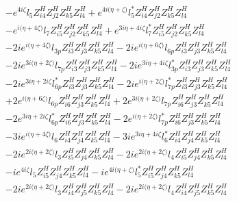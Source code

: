 \begin{align}
 &- e^{4 i \zeta } l_5 Z_{{i 4}}^{H} Z_{{j 2}}^{H} Z_{{k 5}}^{H} Z_{{l 4}}^{H} +e^{4 i \Big(\eta +\zeta \Big)} l_5^* Z_{{i 4}}^{H} Z_{{j 2}}^{H} Z_{{k 5}}^{H} Z_{{l 4}}^{H} \nonumber \\ 
 &- e^{i \Big(\eta +4 \zeta \Big)} l_7 Z_{{i 5}}^{H} Z_{{j 2}}^{H} Z_{{k 5}}^{H} Z_{{l 4}}^{H} +e^{3 i \eta +4 i \zeta } l_7^* Z_{{i 5}}^{H} Z_{{j 2}}^{H} Z_{{k 5}}^{H} Z_{{l 4}}^{H} \nonumber \\ 
 &-2 i e^{i \Big(\eta +4 \zeta \Big)} l_{3p} Z_{{i 3}}^{H} Z_{{j 3}}^{H} Z_{{k 5}}^{H} Z_{{l 4}}^{H} -2 i e^{i \Big(\eta +6 \zeta \Big)} l_{6p} Z_{{i 3}}^{H} Z_{{j 3}}^{H} Z_{{k 5}}^{H} Z_{{l 4}}^{H} \nonumber \\ 
 &-2 i e^{3 i \Big(\eta +2 \zeta \Big)} l_{7p} Z_{{i 3}}^{H} Z_{{j 3}}^{H} Z_{{k 5}}^{H} Z_{{l 4}}^{H} -2 i e^{3 i \eta +4 i \zeta } l_{3p}^* Z_{{i 3}}^{H} Z_{{j 3}}^{H} Z_{{k 5}}^{H} Z_{{l 4}}^{H} \nonumber \\ 
 &-2 i e^{3 i \eta +2 i \zeta } l_{6p}^* Z_{{i 3}}^{H} Z_{{j 3}}^{H} Z_{{k 5}}^{H} Z_{{l 4}}^{H} -2 i e^{i \Big(\eta +2 \zeta \Big)} l_{7p}^* Z_{{i 3}}^{H} Z_{{j 3}}^{H} Z_{{k 5}}^{H} Z_{{l 4}}^{H} \nonumber \\ 
 &+2 e^{i \Big(\eta +6 \zeta \Big)} l_{6p} Z_{{i 6}}^{H} Z_{{j 3}}^{H} Z_{{k 5}}^{H} Z_{{l 4}}^{H} +2 e^{3 i \Big(\eta +2 \zeta \Big)} l_{7p} Z_{{i 6}}^{H} Z_{{j 3}}^{H} Z_{{k 5}}^{H} Z_{{l 4}}^{H} \nonumber \\ 
 &-2 e^{3 i \eta +2 i \zeta } l_{6p}^* Z_{{i 6}}^{H} Z_{{j 3}}^{H} Z_{{k 5}}^{H} Z_{{l 4}}^{H} -2 e^{i \Big(\eta +2 \zeta \Big)} l_{7p}^* Z_{{i 6}}^{H} Z_{{j 3}}^{H} Z_{{k 5}}^{H} Z_{{l 4}}^{H} \nonumber \\ 
 &-3 i e^{i \Big(\eta +4 \zeta \Big)} l_6 Z_{{i 4}}^{H} Z_{{j 4}}^{H} Z_{{k 5}}^{H} Z_{{l 4}}^{H} -3 i e^{3 i \eta +4 i \zeta } l_6^* Z_{{i 4}}^{H} Z_{{j 4}}^{H} Z_{{k 5}}^{H} Z_{{l 4}}^{H} \nonumber \\ 
 &-2 i e^{2 i \Big(\eta +2 \zeta \Big)} l_3 Z_{{i 5}}^{H} Z_{{j 4}}^{H} Z_{{k 5}}^{H} Z_{{l 4}}^{H} -2 i e^{2 i \Big(\eta +2 \zeta \Big)} l_4 Z_{{i 5}}^{H} Z_{{j 4}}^{H} Z_{{k 5}}^{H} Z_{{l 4}}^{H} \nonumber \\ 
 &-i e^{4 i \zeta } l_5 Z_{{i 5}}^{H} Z_{{j 4}}^{H} Z_{{k 5}}^{H} Z_{{l 4}}^{H} -i e^{4 i \Big(\eta +\zeta \Big)} l_5^* Z_{{i 5}}^{H} Z_{{j 4}}^{H} Z_{{k 5}}^{H} Z_{{l 4}}^{H} \nonumber \\ 
 &-2 i e^{2 i \Big(\eta +2 \zeta \Big)} l_3 Z_{{i 4}}^{H} Z_{{j 5}}^{H} Z_{{k 5}}^{H} Z_{{l 4}}^{H} -2 i e^{2 i \Big(\eta +2 \zeta \Big)} l_4 Z_{{i 4}}^{H} Z_{{j 5}}^{H} Z_{{k 5}}^{H} Z_{{l 4}}^{H} \nonumber \\ 

\end{align}
